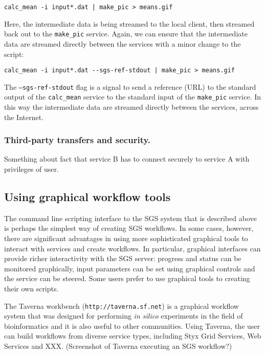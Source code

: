 \documentclass{llncs}
\begin{document}
\begin{verbatim}
calc_mean -i input*.dat | make_pic > means.gif
\end{verbatim}

Here, the intermediate data is being streamed to the local client, then streamed back out to the {\tt make\_pic} service.  Again, we can ensure that the intermediate data are streamed directly between the services with a minor change to the script:

\begin{verbatim}
calc_mean -i input*.dat --sgs-ref-stdout | make_pic > means.gif
\end{verbatim}

The {\tt --sgs-ref-stdout} flag is a signal to send a reference (URL) to the standard output of the {\tt calc\_mean} service to the standard input of the {\tt make\_pic} service.  In this way the intermediate data are streamed directly between the services, across the Internet.

\subsubsection{Third-party transfers and security.}
Something about fact that service B has to connect securely to service A with privileges of user.

\subsection{Using graphical workflow tools}
\label{subsec:graphical-workflow}
The command line scripting interface to the SGS system that is described above is perhaps the simplest way of creating SGS workflows.  In some cases, however, there are significant advantages in using more sophisticated graphical tools to interact with services and create workflows.  In particular, graphical interfaces can provide richer interactivity with the SGS server: progress and status can be monitored graphically, input parameters can be set using graphical controls and the service can be steered.  Some users prefer to use graphical tools to creating their own scripts.

The Taverna workbench ({\tt http://taverna.sf.net}) is a graphical workflow system that was designed for performing {\it in silico} experiments in the field of bioinformatics and it is also useful to other communities.  Using Taverna, the user can build workflows from diverse service types, including Styx Grid Services, Web Services and XXX.  (Screenshot of Taverna executing an SGS workflow?)
\end{document}
